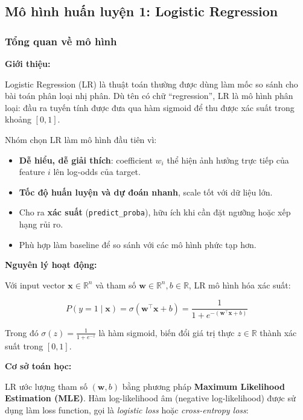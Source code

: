 \documentclass[12pt, a4paper]{article}
\begin{document}
\subsection{Mô hình huấn luyện 1: Logistic Regression}

\subsubsection{Tổng quan về mô hình}

\textbf{Giới thiệu:}

Logistic Regression (LR) là thuật toán thường được dùng làm mốc so sánh cho bài toán phân loại nhị phân. Dù tên có chữ ``regression'', LR là mô hình phân loại: đầu ra tuyến tính được đưa qua hàm sigmoid để thu được xác suất trong khoảng $[0, 1]$.

Nhóm chọn LR làm mô hình đầu tiên vì:
\begin{itemize}
    \item \textbf{Dễ hiểu, dễ giải thích}: coefficient $w_i$ thể hiện ảnh hưởng trực tiếp của feature $i$ lên log-odds của target.
    \item \textbf{Tốc độ huấn luyện và dự đoán nhanh}, scale tốt với dữ liệu lớn.
    \item Cho ra \textbf{xác suất} (\texttt{predict\_proba}), hữu ích khi cần đặt ngưỡng hoặc xếp hạng rủi ro.
    \item Phù hợp làm baseline để so sánh với các mô hình phức tạp hơn.
\end{itemize}

\textbf{Nguyên lý hoạt động:}

Với input vector $\mathbf{x} \in \mathbb{R}^n$ và tham số $\mathbf{w} \in \mathbb{R}^n, b \in \mathbb{R}$, LR mô hình hóa xác suất:

\begin{equation}
P(y = 1 \mid \mathbf{x}) = \sigma(\mathbf{w}^\top \mathbf{x} + b) = \frac{1}{1 + e^{-(\mathbf{w}^\top \mathbf{x} + b)}}
\end{equation}

Trong đó $\sigma(z) = \frac{1}{1+e^{-z}}$ là hàm sigmoid, biến đổi giá trị thực $z \in \mathbb{R}$ thành xác suất trong $[0, 1]$.

\textbf{Cơ sở toán học:}

LR ước lượng tham số $(\mathbf{w}, b)$ bằng phương pháp \textbf{Maximum Likelihood Estimation (MLE)}. Hàm log-likelihood âm (negative log-likelihood) được sử dụng làm loss function, gọi là \emph{logistic loss} hoặc \emph{cross-entropy loss}:
\end{document}
